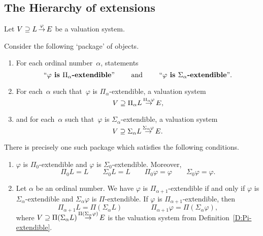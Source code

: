 \documentclass[main.tex]{subfiles}
\begin{document}
\subsection{The Hierarchy of extensions}
\begin{prop}
\label{P:hier}
Let $V \supseteq L\,\smash{\stackrel{\varphi}{\rightarrow}}\,E$
be a valuation system.

Consider the following `package' of objects.
\begin{enumerate}
\item \label{hier:first-cond}
For each ordinal number~$\alpha$,
statements
\begin{equation*}
\text{``\textbf{$\varphi$ is $\Pi_\alpha$-extendible}''}
\qquad\text{ and }\qquad
\text{``\textbf{$\varphi$ is $\Sigma_\alpha$-extendible}''}.
\end{equation*}
\item
For each~$\alpha$ such that~$\varphi$ 
is $\Pi_\alpha$-extendible,
a valuation system 
\begin{equation*}
V \supseteq \Pi_\alpha L\,\smash{\stackrel{\Pi_\alpha \varphi}{\rightarrow}}\,E,
\end{equation*}

\item
and for each~$\alpha$ such that~$\varphi$ is $\Sigma_\alpha$-extendible,
a valuation system 
\begin{equation*}
V \supseteq \Sigma_\alpha L\,\smash{\stackrel{\Sigma_\alpha \varphi}{\rightarrow}}\,E.
\end{equation*}
\end{enumerate}
There is precisely one such package which satisfies
the following conditions.
\begin{enumerate}
\item
$\varphi$ is {$\Pi_0$-extendible}
and $\varphi$ is {$\Sigma_0$-extendible}.
Moreover,
\begin{equation*}
\Pi_0 L = L\qquad 
\Sigma_0 L = L \qquad 
\Pi_0 \varphi = \varphi \qquad
\Sigma_0 \varphi = \varphi.
\end{equation*}

\item
Let $\alpha$ be an ordinal number.
We have 
$\varphi$ is {$\Pi_{\alpha+1}$-extendible}
if and only if $\varphi$ is $\Sigma_{\alpha}$-extendible
and $\Sigma_\alpha \varphi$ is $\Pi$-extendible.
If $\varphi$ is $\Pi_{\alpha+1}$-extendible,
then 
\begin{equation*}
\Pi_{\alpha+1} L = \Pi(\Sigma_\alpha L)\qquad\qquad
\Pi_{\alpha+1} \varphi = \Pi(\Sigma_\alpha \varphi),
\end{equation*}
where 
 $V \supseteq \Pi(\Sigma_\alpha L)\,\smash{\stackrel{\Pi(\Sigma_\alpha\varphi)}{\rightarrow}}\,E$
is the valuation system from Definition~\ref{D:Pi-extendible}.


\end{enumerate}
\end{prop}
\end{document}

